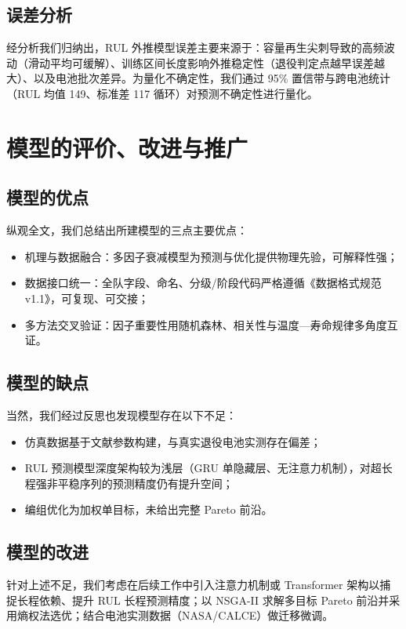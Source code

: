 \documentclass[withoutpreface]{cumcmthesis}
\begin{document}
\subsection{误差分析}
经分析我们归纳出，RUL 外推模型误差主要来源于：容量再生尖刺导致的高频波动（滑动平均可缓解）、训练区间长度影响外推稳定性（退役判定点越早误差越大）、以及电池批次差异。为量化不确定性，我们通过 95\% 置信带与跨电池统计（RUL 均值 149、标准差 117 循环）对预测不确定性进行量化。

\section{模型的评价、改进与推广}
\subsection{模型的优点}
纵观全文，我们总结出所建模型的三点主要优点：
\begin{itemize}[itemindent=2em]
\item 机理与数据融合：多因子衰减模型为预测与优化提供物理先验，可解释性强；
\item 数据接口统一：全队字段、命名、分级/阶段代码严格遵循《数据格式规范 v1.1》，可复现、可交接；
\item 多方法交叉验证：因子重要性用随机森林、相关性与温度—寿命规律多角度互证。
\end{itemize}

\subsection{模型的缺点}
当然，我们经过反思也发现模型存在以下不足：
\begin{itemize}[itemindent=2em]
\item 仿真数据基于文献参数构建，与真实退役电池实测存在偏差；
\item RUL 预测模型深度架构较为浅层（GRU 单隐藏层、无注意力机制），对超长程强非平稳序列的预测精度仍有提升空间；
\item 编组优化为加权单目标，未给出完整 Pareto 前沿。
\end{itemize}

\subsection{模型的改进}
针对上述不足，我们考虑在后续工作中引入注意力机制或 Transformer 架构以捕捉长程依赖、提升 RUL 长程预测精度；以 NSGA-II 求解多目标 Pareto 前沿并采用熵权法选优；结合电池实测数据（NASA/CALCE）做迁移微调。
\end{document}
